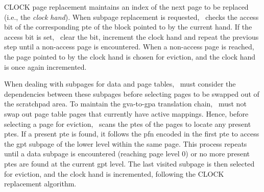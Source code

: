 CLOCK page replacement maintains an index of the next page to be replaced (i.e., the \emph{clock hand}).
When subpage replacement is requested, \thename\ checks the access bit of the corresponding \gls{pte} of the block pointed to by the current hand.
If the access bit is set, \thename\ clear the bit, increment the clock hand and repeat the previous step until a non-access page is encountered.
When a non-access page is reached, the page pointed to by the clock hand is chosen for eviction, and the clock hand is once again incremented.


When dealing with subpages for data and page tables, \thename\ must consider the dependencies between these subpages before selecting pages to be swapped out of the scratchpad area.
To maintain the \gls{gva}-to-\gls{gpa} translation chain, \thename\ must not swap out page table pages that currently have active mappings.
Hence, before selecting a page for eviction, \thename\ scans the \glspl{pte} of the pages to locate any present \glspl{pte}.
If a present \gls{pte} is found, it follows the \gls{pfn} encoded in the first \gls{pte} to access the \gls{gpt} subpage of the lower level within the same page.
This process repeats until a data subpage is encountered (reaching page level 0) or no more present \glspl{pte} are found at the current \gls{gpt} level.
The last visited subpage is then selected for eviction, and the clock hand is incremented, following the CLOCK replacement algorithm.

%

